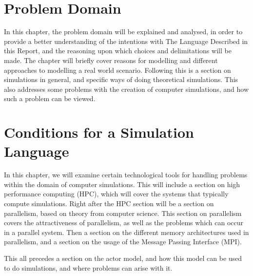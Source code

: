\chapter{Problem Domain}\label{part:analysis}

In this chapter, the problem domain will be explained and analysed, in order to provide a better understanding of the intentions with The Language Described in this Report, and the reasoning upon which choices and delimitations will be made. The chapter will briefly cover reasons for modelling and different approaches to modelling a real world scenario.
Following this is a section on simulations in general, and specific ways of doing theoretical simulations. This also addresses some problems with the creation of computer simulations, and how such a problem can be viewed.



\chapter{Conditions for a Simulation Language}\label{part:analysis2}

In this chapter, we will examine certain technological tools for handling problems within the domain of computer simulations. This will include a section on high performance computing (HPC), which will cover the systems that typically compute simulations. Right after the HPC section will be a section on parallelism, based on theory from computer science. This section on parallelism covers the attractiveness of parallelism, as well as the problems which can occur in a parallel system. Then a section on the different memory architectures used in parallelism, and a section on the usage of the Message Passing Interface (MPI).

This all precedes a section on the actor model, and how this model can be used to do simulations, and where problems can arise with it.







